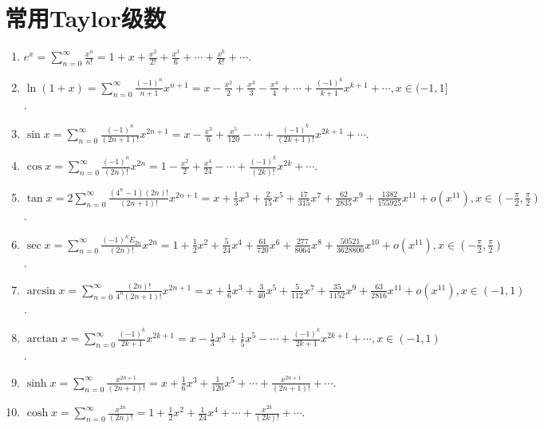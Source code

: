 \documentclass[../../main.tex]{subfiles}
\begin{document}
\section{常用Taylor级数}

\begin{enumerate}
\item $e^x=\sum_{n=0}^{\infty}\frac{x^n}{n!}=1+x+\frac{x^2}{2!}+\frac{x^3}{6}+\cdots+\frac{x^k}{k!}+\cdots$.
\\
\item $\ln(1+x)=\sum_{n=0}^{\infty}\frac{(-1)^n}{n+1}x^{n+1}=x-\frac{x^2}{2}+\frac{x^3}{3}-\frac{x^4}{4}+\cdots+\frac{(-1)^k}{k+1}x^{k+1}+\cdots,x\in(-1,1]$.
\\
\item $\sin x=\sum_{n=0}^{\infty}\frac{(-1)^n}{(2n+1)!}x^{2n+1}=x-\frac{x^3}{6}+\frac{x^5}{120}-\cdots+\frac{(-1)^k}{(2k+1)!}x^{2k+1}+\cdots$.
\\
\item $\cos x=\sum_{n=0}^{\infty}\frac{(-1)^n}{(2n)!}x^{2n}=1-\frac{x^2}{2}+\frac{x^4}{24}-\cdots+\frac{(-1)^k}{(2k)!}x^{2k}+\cdots$.
\\
\item $\tan x=2\sum_{n=0}^{\infty}\frac{(4^n-1)(2n)!}{(2n+1)!}x^{2n+1}=x+\frac{1}{3}x^3+\frac{2}{15}x^5+\frac{17}{315}x^7+\frac{62}{2835}x^9+\frac{1382}{155925}x^{11}+o(x^{11}),x\in\left(-\frac{\pi}{2},\frac{\pi}{2}\right)$.
\\
\item $\sec x=\sum_{n=0}^{\infty}\frac{(-1)^nE_{2n}}{(2n)!}x^{2n}=1+\frac{1}{2}x^2+\frac{5}{24}x^4+\frac{61}{720}x^6+\frac{277}{8064}x^8+\frac{50521}{3628800}x^{10}+o(x^{11}),x\in\left(-\frac{\pi}{2},\frac{\pi}{2}\right)$.
\\
\item $\arcsin x=\sum_{n=0}^{\infty}\frac{(2n)!}{4^n(2n+1)!}x^{2n+1}=x+\frac{1}{6}x^3+\frac{3}{40}x^5+\frac{5}{112}x^7+\frac{35}{1152}x^9+\frac{63}{2816}x^{11}+o(x^{11}),x\in(-1,1)$.
\\
\item $\arctan x=\sum_{n=0}^{\infty}\frac{(-1)^k}{2k+1}x^{2k+1}=x-\frac{1}{3}x^3+\frac{1}{5}x^5-\cdots+\frac{(-1)^k}{2k+1}x^{2k+1}+\cdots,x\in(-1,1)$.
\\
\item $\sinh x=\sum_{n=0}^{\infty}\frac{x^{2n+1}}{(2n+1)!}=x+\frac{1}{6}x^3+\frac{1}{120}x^5+\cdots+\frac{x^{2n+1}}{(2n+1)!}+\cdots$.
\\
\item $\cosh x=\sum_{n=0}^{\infty}\frac{x^{2n}}{(2n)!}=1+\frac{1}{2}x^2+\frac{1}{24}x^4+\cdots+\frac{x^{2k}}{(2k)!}+\cdots$.

\end{enumerate}
\end{document}
